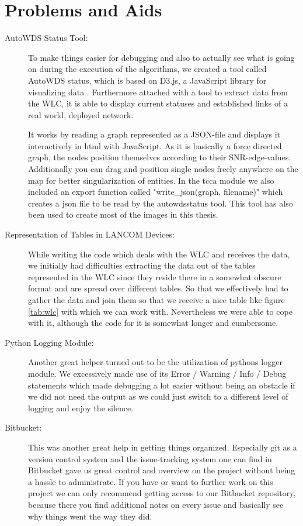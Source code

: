   \section{Problems and Aids}
    \begin{description}
    \item [AutoWDS Status Tool:]
      To make things easier for debugging and also to actually see what is going on during the execution of the algorithms,
      we created a tool called AutoWDS status, which is based on D3.js, a JavaScript library for visualizing data \cite{d3js}.
      Furthermore attached with a tool to extract data from the \ac{WLC}, it is able to display current statuses and established links of a real world, deployed network.
      
      It works by reading a graph represented as a \ac{JSON}-file and displays it interactively in html with JavaScript.
      As it is basically a force directed graph, the nodes position themselves according to their \ac{SNR}-edge-values. 
      Additionally you can drag and position single nodes freely anywhere on the map for better singularization of entities.
      In the tcca module we also included an export function called "write\_json(graph, filename)" which creates a json file to be read by the autowdsstatus tool.
      This tool has also been used to create most of the images in this thesis.

    \item [Representation of Tables in LANCOM Devices:]
      While writing the code which deals with the \ac{WLC} and receives the data, 
      we initially had difficulties extracting the data out of the tables represented in the \ac{WLC} since
      they reside there in a somewhat obscure format and are spread over different tables. So that we effectively had to gather the data and join them so that we receive a
      nice table like figure \ref{tab:wlc} with which we can work with. 
      Nevertheless we were able to cope with it, although the code for it is somewhat longer and cumbersome.

    \item [Python Logging Module:]
      Another great helper turned out to be the utilization of pythons logger module. 
      We excessively made use of its Error / Warning / Info / Debug statements which made debugging
      a lot easier without being an obstacle if we did not need the output as we could just switch to a different level of logging and enjoy the silence.
    
    \item [Bitbucket:]
      This was another great help in getting things organized. Especially git \cite{git} 
      as a version control system and the issue-tracking system one can find in Bitbucket \cite{bitbucket}
      gave us great control and overview on the project without being a hassle to administrate. 
      If you have or want to further work on this project we can only recommend
      getting access to our Bitbucket repository, because there you find additional notes on every issue and basically see why things went the way they did.
      

\end{description}
